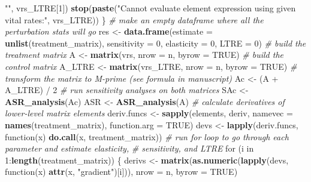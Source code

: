 \documentclass[]{article}
\newenvironment{Shaded}{\begin{snugshade}}{\end{snugshade}}
\newcommand{\KeywordTok}[1]{\textcolor[rgb]{0.13,0.29,0.53}{\textbf{{#1}}}}
\newcommand{\DataTypeTok}[1]{\textcolor[rgb]{0.13,0.29,0.53}{{#1}}}
\newcommand{\DecValTok}[1]{\textcolor[rgb]{0.00,0.00,0.81}{{#1}}}
\newcommand{\StringTok}[1]{\textcolor[rgb]{0.31,0.60,0.02}{{#1}}}
\newcommand{\CommentTok}[1]{\textcolor[rgb]{0.56,0.35,0.01}{\textit{{#1}}}}
\newcommand{\OtherTok}[1]{\textcolor[rgb]{0.56,0.35,0.01}{{#1}}}
\newcommand{\NormalTok}[1]{{#1}}
\begin{document}
\begin{Shaded}
\begin{Highlighting}[]
{{                        \StringTok{""}\NormalTok{, vrs_LTRE[}\DecValTok{1}\NormalTok{])}
        \KeywordTok{stop}\NormalTok{(}\KeywordTok{paste}\NormalTok{(}\StringTok{"Cannot evaluate element expression using given vital rates:"}\NormalTok{,}
                   \NormalTok{vrs_LTRE))}
      \NormalTok{\}}
      \CommentTok{# make an empty dataframe where all the perturbation stats will go}
      \NormalTok{res <-}\StringTok{ }\KeywordTok{data.frame}\NormalTok{(}\DataTypeTok{estimate =} \KeywordTok{unlist}\NormalTok{(treatment_matrix), }\DataTypeTok{sensitivity =} \DecValTok{0}\NormalTok{, }
                        \DataTypeTok{elasticity =} \DecValTok{0}\NormalTok{, }\DataTypeTok{LTRE =} \DecValTok{0}\NormalTok{)}
      \CommentTok{# build the treatment matrix}
      \NormalTok{A <-}\StringTok{ }\KeywordTok{matrix}\NormalTok{(vrs, }\DataTypeTok{nrow =} \NormalTok{n, }\DataTypeTok{byrow =} \OtherTok{TRUE}\NormalTok{)}
      \CommentTok{# build the control matrix}
      \NormalTok{A_LTRE <-}\StringTok{ }\KeywordTok{matrix}\NormalTok{(vrs_LTRE, }\DataTypeTok{nrow =} \NormalTok{n, }\DataTypeTok{byrow =} \OtherTok{TRUE}\NormalTok{)}
      \CommentTok{# transform the matrix to M-prime (see formula in manuscript)}
      \NormalTok{Ac <-}\StringTok{ }\NormalTok{(A +}\StringTok{ }\NormalTok{A_LTRE) /}\StringTok{ }\DecValTok{2}
      \CommentTok{# run sensitivity analyses on both matrices}
      \NormalTok{SAc <-}\StringTok{ }\KeywordTok{ASR_analysis}\NormalTok{(Ac)}
      \NormalTok{ASR <-}\StringTok{ }\KeywordTok{ASR_analysis}\NormalTok{(A)}
      \CommentTok{# calculate derivatives of lower-level matrix elements}
      \NormalTok{deriv.funcs <-}\StringTok{ }\KeywordTok{sapply}\NormalTok{(elements, deriv, }\DataTypeTok{namevec =} \KeywordTok{names}\NormalTok{(treatment_matrix), }
                            \DataTypeTok{function.arg =} \OtherTok{TRUE}\NormalTok{)}
      \NormalTok{devs <-}\StringTok{ }\KeywordTok{lapply}\NormalTok{(deriv.funcs, function(x) }\KeywordTok{do.call}\NormalTok{(x, treatment_matrix))}
      \CommentTok{# run for loop to go through each parameter and estimate elasticity,}
      \CommentTok{# sensitivity, and LTRE}
      \NormalTok{for (i in }\DecValTok{1}\NormalTok{:}\KeywordTok{length}\NormalTok{(treatment_matrix)) \{}
        \NormalTok{derivs <-}\StringTok{ }\KeywordTok{matrix}\NormalTok{(}\KeywordTok{as.numeric}\NormalTok{(}\KeywordTok{lapply}\NormalTok{(devs, function(x) }\KeywordTok{attr}\NormalTok{(x, }\StringTok{"gradient"}\NormalTok{)[i])), }
                         \DataTypeTok{nrow =} \NormalTok{n, }\DataTypeTok{byrow =} \OtherTok{TRUE}\NormalTok{)}
}}
\end{Highlighting}
\end{Shaded}
\end{document}
